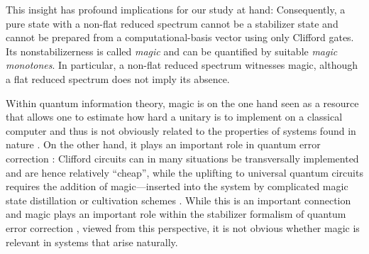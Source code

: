\documentclass[aps,pra,reprint,superscriptaddress]{revtex4-2}
\theoremstyle{definition}
\theoremstyle{remark}
\begin{document}
This insight has profound implications for our study at hand: Consequently, a pure state with a non-flat reduced spectrum cannot be a stabilizer state and cannot be prepared from a computational-basis vector using only Clifford gates. Its nonstabilizerness is called \emph{magic} and can be quantified by suitable \emph{magic monotones}. In particular, a non-flat reduced spectrum witnesses magic, although a flat reduced spectrum does not imply its absence.

Within quantum information theory, magic is
on the one hand seen
as a resource that allows one to estimate how hard a unitary is to implement on a classical computer and thus is not obviously related to the properties of systems found in nature
\cite{PhysRevLett.116.250501}. 
On the other hand, it plays an important role in quantum error correction \cite{Roads}: Clifford circuits can in many situations be transversally implemented and are hence relatively ``cheap'', while the uplifting to universal quantum circuits requires the addition of magic---inserted into the system by complicated magic state distillation \cite{PhysRevA.71.022316,PhysRevA.95.022316} or cultivation schemes \cite{Cultivation}. While this is an important connection and magic plays an important role within the 
stabilizer formalism of quantum error correction \cite{Gottesman:1997zz}, viewed from this perspective,
it is not obvious whether magic is relevant in systems that arise naturally. 
\end{document}
